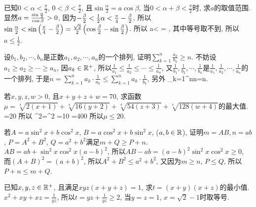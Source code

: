\bq{}{}
已知$0<\alpha<\frac{\pi}{2}$, $0<\beta<\frac{\pi}{2}$, 且$\sin\frac{\alpha}{2}=a\cos \beta$, 
当$0<\alpha+\beta<\frac{\pi}{2}$时, 求$a$的取值范围.
\eq
\ba
显然$a=\frac{\sin\frac{\alpha}{2}}{\cos\beta}>0$, 因为$-\frac{\beta}{2}<\frac12\alpha<\frac{\pi}{4}-\frac{\beta}{2}$,
所以$\sin\frac{\alpha}{2}<\sin\left(\frac{\pi}{4}-\frac{\beta}{2}\right)=\frac{\sqrt{2}}{2}\left(\cos\frac{\beta}{2}-\sin\frac{\beta}{2}\right)$.
所以
\bee
a<
  =
  \ge{},
\eee
其中等号取不到, 所以$a\le\frac12$.
\ea

\bq{}{}
设$b_1,b_2,\cdots,b_n$是正数$a_1,a_2,\cdots,a_n$的一个排列, 证明$\sum_{k=1}^{n}\frac{a_k}{b_k}\ge n$.
\eq
\ba
不妨设$a_1\ge a_2\ge\cdots\ge a_n$, 因$a_k\in\mathbb{R}^+$, 所以$\frac1{a_1}\le\frac1{a_2}\le\cdots\le\frac1{a_n}$,
又$\frac1{b_1},\frac1{b_2},\cdots,\frac1{b_n}$是$\frac1{a_1},\frac1{a_2},\cdots,\frac1{a_n}$的一个排列,
于是$n= \sum_{k=1}^{n}a_k\cdot\frac1{a_k}\le\sum_{k=1}^{n}a_k\cdot\frac1{b_k}$, 另外
\bee
\sum_{k=1}^n\ge n=n.
\eee
\ea

\bq{}{}
若$x,y,z,w>0$, 且$x+y+z+w=70$, 
求函数$\mu=\sqrt[4]{2(x+1)}+\sqrt[4]{16(y+2)}+\sqrt[4]{54(z+3)}+\sqrt[4]{128(w+4)}$的最大值.
\eq
\ba
\bee
 \mu\le{}=20
\eee
所以
\bee
{}^2=^2
  \le{}
  =10\sum{}
  =400\cdot{}
\eee
所以$\mu\le 20$.
\ea

\bq{}{}
若$A=a\sin^2x+b\cos^2x$, $B=a\cos^2x+b\sin^2x$, ($a,b\in\mathbb{R}$), 
证明$m=AB, n=ab$, $P=A^2+B^2$, $Q=a^2+b^2$满足$m+Q\ge P+n$.
\eq
\ba
$AB=ab+\sin^2x\cos^2x(a-b)^2$, 所以$AB-ab=(a-b)^2\sin^2x\cos^2x\ge0$, 
而$(A+B)^2=(a+b)^2$, 所以$A^2+B^2\le a^2+b^2$, 又因为$m\ge n$, $P\le Q$, 
所以$P+n\le m+Q$.
\ea

\bq{}{}
已知$x,y,z\in\mathbb{R}^+$, 且满足$xyz(x+y+z)=1$, 求$t=(x+y)(x+z)$的最小值.
\eq
\ba
$x^2+xy+xz=\frac{1}{yz}$, 所以$t=yz+\frac1{yz}\ge2$, 当$y=z=1$, $x=\sqrt{2}-1$时取等号.
\ea

